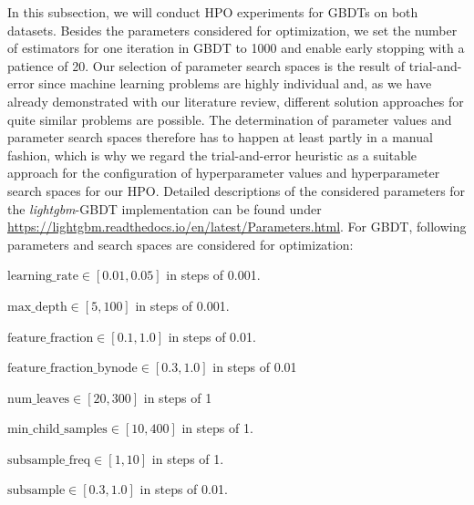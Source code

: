 In this subsection, we will conduct HPO experiments for GBDTs on both datasets. 
Besides the parameters considered for optimization, we set the number of estimators for one iteration in GBDT to 1000 and enable early stopping with a patience of 20. Our selection of parameter search spaces is the result of trial-and-error since machine learning problems are highly individual and, as we have already demonstrated with our literature review, different solution approaches for quite similar problems are possible. The determination of parameter values and parameter search spaces therefore has to happen at least partly in a manual fashion, which is why we regard the trial-and-error heuristic as a suitable approach for the configuration of hyperparameter values and hyperparameter search spaces for our HPO. Detailed descriptions of the considered parameters for the \textit{lightgbm}-GBDT implementation can be found under \url{https://lightgbm.readthedocs.io/en/latest/Parameters.html}. For GBDT, following parameters and search spaces are considered for optimization:
\begin{description}[font=$\bullet$\scshape\bfseries]
	\item $ \text{learning\_rate} \in [0.01, 0.05] $  in steps of 0.001.
	\item $ \text{max\_depth} \in [5, 100] $ in steps of 0.001.
	\item $ \text{feature\_fraction} \in [0.1, 1.0] $ in steps of 0.01.
	\item $ \text{feature\_fraction\_bynode} \in [0.3, 1.0] $ in steps of 0.01
	\item $ \text{num\_leaves} \in [20, 300] $ in steps of 1
	\item $ \text{min\_child\_samples} \in [10, 400] $ in steps of 1.
	\item $ \text{subsample\_freq} \in [1, 10] $ in steps of 1.
	\item $ \text{subsample} \in [0.3, 1.0] $ in steps of 0.01.
\end{description}

